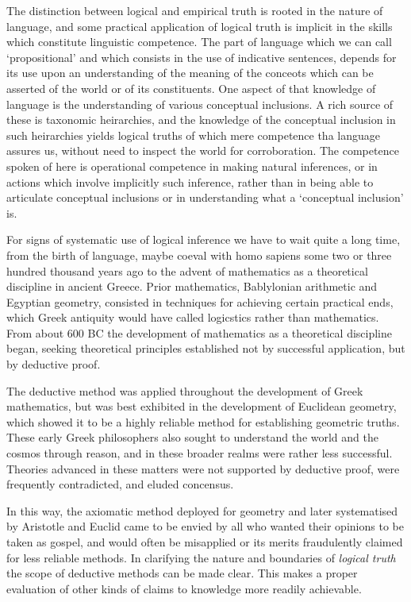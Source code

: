 \documentclass[10pt,titlepage]{article}
\begin{document}
The distinction between logical and empirical truth is rooted in the nature of language, and some practical application of logical truth is implicit in the skills which constitute linguistic competence.
The part of language which we can call `propositional' and which consists in the use of indicative sentences, depends for its use upon an understanding of the meaning of the conceots which can be asserted of the world or of its constituents.
One aspect of that knowledge of language is the understanding of various conceptual inclusions.
A rich source of these is taxonomic heirarchies, and the knowledge of the conceptual inclusion in such heirarchies yields logical truths of which mere competence tha language assures us, without need to inspect the world for corroboration.
The competence spoken of here is operational competence in making natural inferences, or in actions which involve implicitly such inference, rather than in being able to articulate conceptual inclusions or in understanding what a `conceptual inclusion' is.


For signs of systematic use of logical inference we have to wait quite a long time, from the birth of language, maybe coeval with homo sapiens some two or three hundred thousand years ago to the advent of mathematics as a theoretical discipline in ancient Greece.
Prior mathematics, Bablylonian arithmetic and Egyptian geometry, consisted in techniques for achieving certain practical ends, which Greek antiquity would have called logicstics rather than mathematics.
From about 600 BC the development of mathematics as a theoretical discipline began, seeking theoretical principles established not by successful application, but by deductive proof.

The deductive method was applied throughout the development of Greek mathematics, but was best exhibited in the development of Euclidean geometry, which showed it to be a highly reliable method for establishing geometric truths.
These early Greek philosophers also sought to understand the world and the cosmos through reason, and in these broader realms were rather less successful.
Theories advanced in these matters were not supported by deductive proof, were frequently contradicted, and eluded concensus.

In this way, the axiomatic method deployed for geometry and later systematised by Aristotle and Euclid came to be envied by all who wanted their opinions to be taken as gospel, and would often be misapplied or its merits fraudulently claimed for less reliable methods.
In clarifying the nature and boundaries of \emph{logical truth} the scope of deductive methods can be made clear.
This makes a proper evaluation of other kinds of claims to knowledge more readily achievable.
\end{document}

